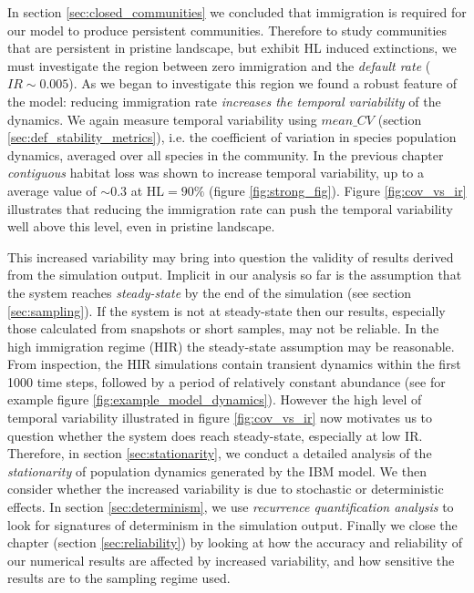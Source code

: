 In section \ref{sec:closed_communities} we concluded that immigration is required for our model to produce persistent communities. Therefore to study communities that are persistent in pristine landscape, but exhibit HL induced extinctions, we must investigate the region between zero immigration and the \emph{default rate} ($IR\sim 0.005$). As we began to investigate this region we found a robust feature of the model: reducing immigration rate \emph{increases the temporal variability} of the dynamics. We again measure temporal variability using $mean\_CV$ (section \ref{sec:def_stability_metrics}), i.e. the coefficient of variation in species population dynamics, averaged over all species in the community. In the previous chapter \emph{contiguous} habitat loss was shown to increase temporal variability, up to a average value of $\sim 0.3$ at HL$=90\%$ (figure \ref{fig:strong_fig}). Figure \ref{fig:cov_vs_ir} illustrates that reducing the immigration rate can push the temporal variability well above this level, even in pristine landscape. 


This increased variability may bring into question the validity of results derived from the simulation output. Implicit in our analysis so far is the assumption that the system reaches \emph{steady-state} by the end of the simulation (see section \ref{sec:sampling}). If the system is not at steady-state then our results, especially those calculated from snapshots or short samples, may not be reliable. In the high immigration regime (HIR) the steady-state assumption may be reasonable. From inspection, the HIR simulations contain transient dynamics within the first 1000 time steps, followed by a period of relatively constant abundance (see for example figure \ref{fig:example_model_dynamics}). However the high level of temporal variability illustrated in figure \ref{fig:cov_vs_ir} now motivates us to question whether the system does reach steady-state, especially at low IR. Therefore, in section \ref{sec:stationarity}, we conduct a detailed analysis of the \emph{stationarity} of population dynamics generated by the IBM model. We then consider whether the increased variability is due to stochastic or deterministic effects. In section \ref{sec:determinism}, we use \emph{recurrence quantification analysis} to look for signatures of determinism in the simulation output. Finally we close the chapter (section \ref{sec:reliability}) by looking at how the accuracy and reliability of our numerical results are affected by increased variability, and how sensitive the results are to the sampling regime used.

